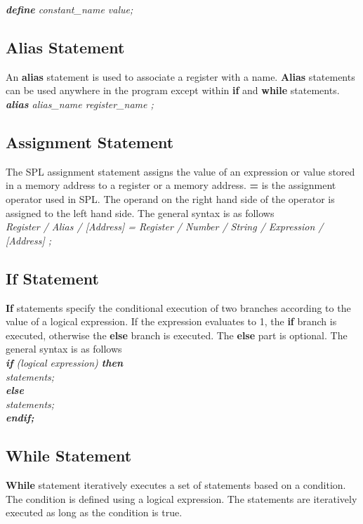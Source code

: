 \documentclass[11pt]{article}
\begin{document}
\textit{ \textbf{define} constant\_name value; }


\subsection{Alias Statement}
An \textbf{alias} statement is used to  associate a register with a name. \textbf{Alias} statements can be used anywhere in the program except within \textbf{if} and \textbf{while} statements.\\

\indent \textit{ \textbf{alias}  alias\_name register\_name ;} \\


\subsection{Assignment Statement}
The SPL assignment statement assigns the value of an  expression or value stored in a memory address to a register or a memory address. \textbf{=} is the assignment operator used in SPL. The operand on the right hand side of the operator is assigned to the left hand side. The general syntax is as follows \\

\indent \textit{ Register / Alias / [Address] = Register / Number / String / Expression / [Address] ;}


\subsection{If Statement}
\textbf{If} statements specify the conditional execution of two branches according to the value of a logical expression. If the expression evaluates to 1, the \textbf{if} branch is executed, otherwise the \textbf{else}  branch is executed. The \textbf{else} part is optional. The general syntax is as follows  \\

\textit{
\textbf{if} (logical expression) \textbf{then}  \\
 \indent \indent statements; \\
\indent \textbf{else} \\
\indent  \indent statements; \\
\indent \textbf{endif;}  \\
}



\subsection{While Statement}
\textbf{While} statement iteratively executes a set of statements based on a condition. The condition is defined using a logical expression.  The statements are iteratively executed as long as the condition is true.\\
\end{document}
